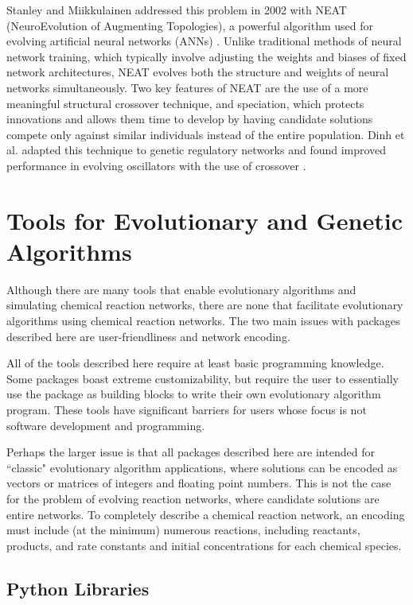 \documentclass[12pt]{report}
\begin{document}
Stanley and Miikkulainen addressed this problem in 2002 with NEAT (NeuroEvolution of Augmenting Topologies), a powerful algorithm used for evolving artificial neural networks (ANNs) \cite{stanley_evolving_2002}. Unlike traditional methods of neural network training, which typically involve adjusting the weights and biases of fixed network architectures, NEAT evolves both the structure and weights of neural networks simultaneously. Two key features of NEAT are the use of a more meaningful structural crossover technique, and speciation, which protects innovations and allows them time to develop by having candidate solutions compete only against similar individuals instead of the entire population. Dinh et al. adapted this technique to genetic regulatory networks and found improved performance in evolving oscillators with the use of crossover \cite{dinh_effective_2015}.

\section{Tools for Evolutionary and Genetic Algorithms}
\label{section:tools_GA}
Although there are many tools that enable evolutionary algorithms and simulating chemical reaction networks, there are none that facilitate evolutionary algorithms using chemical reaction networks. The two main issues with packages described here are user-friendliness and network encoding.

All of the tools described here require at least basic programming knowledge. Some packages boast extreme customizability, but require the user to essentially use the package as building blocks to write their own evolutionary algorithm program. These tools have significant barriers for users whose focus is not software development and programming.

Perhaps the larger issue is that all packages described here are intended for ``classic" evolutionary algorithm applications, where solutions can be encoded as vectors or matrices of integers and floating point numbers. This is not the case for the problem of evolving reaction networks, where candidate solutions are entire networks. To completely describe a chemical reaction network, an encoding must include (at the minimum) numerous reactions, including reactants, products, and rate constants and initial concentrations for each chemical species.  

\subsection{Python Libraries}
\end{document}
